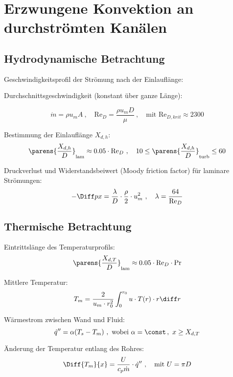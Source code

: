 
\section{Erzwungene Konvektion an durchströmten Kanälen} %
	\subsection{Hydrodynamische Betrachtung} %
		Geschwindigkeitsprofil der Strömung nach der Einlauflänge:

		Durchschnittsgeschwindigkeit (konstant über ganze Länge):

		\[
			\dot{m} = \rho u_m A
			\ ,\quad
			\mathrm{Re}_D = \frac{\rho u_m D}{\mu}
			\ ,\quad
			\text{mit } \mathrm{Re}_{D,krit} \approx 2300
		\]

		Bestimmung der Einlauflänge $X_{d,h}$:
		\[
			\parens{\frac{X_{d,h}}{D}}_\text{lam} \approx 0.05 \cdot \mathrm{Re}_D
			\ ,\quad
			10 \leq \parens{\frac{X_{d,h}}{D}}_\text{turb} \leq 60
		\]

		Druckverlust und Widerstandsbeiwert (Moody friction factor) für laminare Strömungen:
		\[
			-\Diff p x = \frac \lambda D \cdot \frac \rho 2 \cdot u_m^2
			\ ,\quad
			\lambda = \frac{64}{\mathrm{Re}_D}
		\]

	\subsection{Thermische Betrachtung} %
		Eintrittslänge des Temperaturprofils:
		\[
			\parens{\frac{X_{d,T}}{D}}_\text{lam} \approx 0.05 \cdot \mathrm{Re}_D \cdot \mathrm{Pr}
		\]

		Mittlere Temperatur:
		\[
			T_m = \frac{2}{u_m \cdot r_0^2} \int_0^{r_0} u \cdot T(r) \cdot r \diff r
		\]

		Wärmestrom zwischen Wand und Fluid:
		\[
			\dot{q}'' = \alpha (T_s - T_m)
			\ ,\ \text{wobei } \alpha = \const\,, \ x \geq X_{d,T}
		\]

		Änderung der Temperatur entlang des Rohres:
		\[
			\Diff{T_m}{x} = \frac{U}{c_p \dot m} \cdot \dot{q}''
			\ ,\quad \text{mit } U = \pi D
		\]

